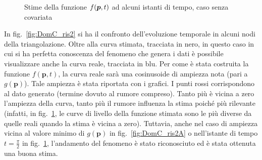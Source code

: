 \documentclass[a4paper,11pt,twoside,openright]{book}							%
\begin{document}
\begin{figure}[H]
{   }
	\caption{Stime della funzione $f(\protect\bm{p},t)$ ad alcuni istanti di tempo, caso senza covariata}
	\label{fig:DomC_ris}
\end{figure}
\newpage
In fig.~\ref{fig:DomC_ris2} si ha il confronto dell'evoluzione temporale in alcuni nodi della triangolazione. Oltre alla curva stimata, tracciata in nero, in questo caso in cui si ha perfetta conoscenza del fenomeno che genera i dati è possibile visualizzare anche la curva reale, tracciata in blu. Per come è stata costruita la funzione $f(\bm{p},t)$, la curva reale sarà una cosinusoide di ampiezza nota (pari a $g(\bm p)$). Tale ampiezza è stata riportata con i grafici. I punti rossi corrispondono al dato generato (termine dovuto al rumore compreso). Tanto più è vicina a zero l'ampiezza della curva, tanto più il rumore influenza la stima poiché più rilevante (infatti, in fig.~\ref{fig:DomC_ris}, le curve di livello della funzione stimata sono le più diverse da quelle reali quando la stima è vicina a zero). Tuttavia, anche nel caso di ampiezza vicina al valore minimo di $g(\bm p)$ in fig.~\ref{fig:DomC_ris2A} o nell'istante di tempo $t=\frac{\pi}{2}$ in fig.~\ref{fig:DomC_ris}, l'andamento del fenomeno è stato riconosciuto ed è stata ottenuta una buona stima.
\end{document}
